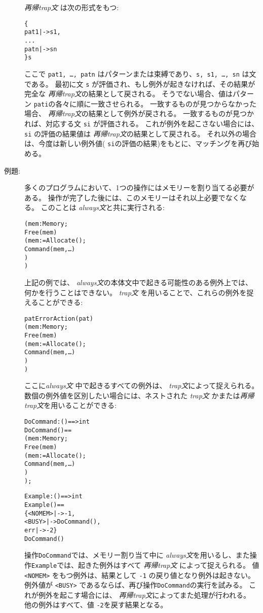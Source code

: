 \documentclass[\pformat,12pt]{jarticle}
\begin{document}
\begin{description}
  {\it 再帰trap文\/} は次の形式をもつ:
  \begin{alltt}
     \{
      pat1 |-> s1,
      ...
      patn |-> sn
    \}  s
  \end{alltt}
ここで {\tt pat1, \ldots, patn} はパターンまたは束縛であり、{\tt s, s1, \ldots,
    sn} は文である。 
最初に文 {\tt s} が評価され、もし例外が起きなければ、その結果が完全な {\it 再帰trap文}の結果として戻される。
そうでない場合、値はパターン {\tt pati}の各々に順に一致させられる。 
一致するものが見つからなかった場合、 {\it 再帰trap文}の結果として例外が戻される。
一致するものが見つかれば、対応する文 {\tt    si} が評価される。
これが例外を起こさない場合には、 {\tt si} の評価の結果値は {\it 再帰trap文}の結果として戻される。
それ以外の場合は、今度は新しい例外値( {\tt si}の評価の結果)をもとに、マッチングを再び始める。

\item[例題:] 多くのプログラムにおいて、1つの操作にはメモリーを割り当てる必要がある。
操作が完了した後には、このメモリーはそれ以上必要でなくなる。
このことは {\it always文}と共に実行される:
  \begin{alltt}
    (  mem : Memory;
       Free(mem) 
      ( mem := Allocate();
        Command(mem, \ldots)
      )
    )
  \end{alltt}
上記の例では、 {\it always文}の本体文中で起きる可能性のある例外上では、何かを行うことはできない。
 {\it trap文\/} を用いることで、これらの例外を捉えることができる:
  \begin{alltt}
     pat  ErrorAction(pat) 
    (  mem : Memory;
       Free(mem) 
      ( mem := Allocate();
        Command(mem, \ldots)
      )
    )
  \end{alltt}
 ここに{\it always文\/} 中で起きるすべての例外は、 {\it trap文}によって捉えられる。
数個の例外値を区別したい場合には、ネストされた {\it trap文\/} かまたは{\it 再帰trap文}を用いることができる:
  \begin{alltt}
    DoCommand : () ==> int
    DoCommand () ==
    (  mem : Memory;
       Free(mem) 
      ( mem := Allocate();
        Command(mem, \ldots)
      )
    );

    Example : () ==> int
    Example () ==
    \{ <NOMEM> |->  -1,
      <BUSY>  |-> DoCommand(),
      err     |->  -2 \}
      DoCommand()
  \end{alltt}
操作{\tt DoCommand}では、メモリー割り当て中に {\it always文\/}を用いるし、また操作{\tt Example}では、起きた例外はすべて {\it   再帰trap文\/} によって捉えられる。
値 {\tt <NOMEM>} をもつ例外は、結果として {\tt -1} の戻り値となり例外は起きない。
例外値が {\tt <BUSY>} であるならば、再び操作{\tt DoCommand}の実行を試みる。
これが例外を起こす場合には、 {\it 再帰trap文}によってまた処理が行われる。
他の例外はすべて、値 {\tt -2}を戻す結果となる。
\end{description}
\end{document}

